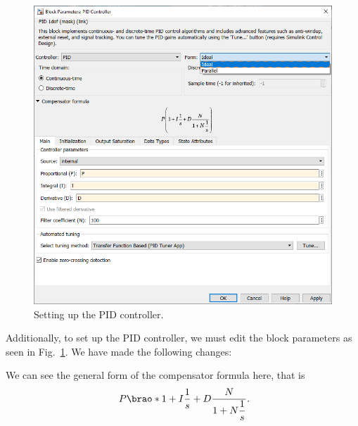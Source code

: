 \documentclass[12pt]{article}
\DeclarePairedDelimiter\brao()%
\newcommand\matlab{matlab}
\begin{document}
\begin{figure}
    \centering
    \includegraphics[width=\linewidth]{img/task00_010_setting_up_PID_controller.png}
    \caption{Setting up the PID controller.}
    \label{fig:pid controller block parameters}
\end{figure}

Additionally, to set up the PID controller, we must edit the block parameters as seen in Fig.~\ref{fig:pid controller block parameters}. We have made the following changes:

We can see the general form of the compensator formula here, that is
\begin{equation}\label{eq:ideal compensator}
    P\brao*{1 + I\frac1s + D\frac{N}{\displaystyle1 + N\frac1s}}\rlap.
\end{equation}
\end{document}
